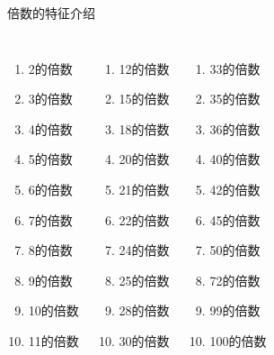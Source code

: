 \documentclass[aspectratio=169]{ctexbeamer} %
\date{\today}
\begin{document}
\begin{frame}[t]{倍数的特征介绍}
\begin{spacing}{1.1}
\normalsize
\begin{columns}
\begin{enumerate}[label={(\arabic*)、}, start=1]
\item 2的倍数
\item 3的倍数
\item 4的倍数
\item 5的倍数
\item 6的倍数
\item 7的倍数
\item 8的倍数
\item 9的倍数
\item 10的倍数
\item 11的倍数
\end{enumerate}

\begin{enumerate}[label={(\arabic*)、}, start=11]
\item 12的倍数
\item 15的倍数
\item 18的倍数
\item 20的倍数
\item 21的倍数
\item 22的倍数
\item 24的倍数
\item 25的倍数
\item 28的倍数
\item 30的倍数
\end{enumerate}

\begin{enumerate}[label={(\arabic*)、}, start=21]
\item 33的倍数
\item 35的倍数
\item 36的倍数
\item 40的倍数
\item 42的倍数
\item 45的倍数
\item 50的倍数
\item 72的倍数
\item 99的倍数
\item 100的倍数
\end{enumerate}

\end{columns}

\end{spacing}
\end{frame}
\end{document}
